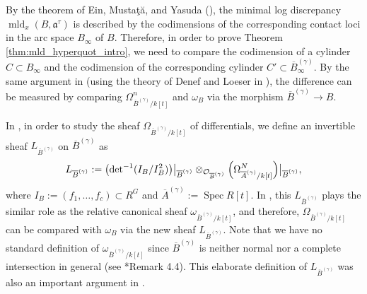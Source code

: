 \documentclass[a4paper,11pt]{amsart}
\theoremstyle{definition}
\theoremstyle{remark}
\begin{document}
By the theorem of Ein, Musta{\c{t}}{\u{a}}, and Yasuda (\cite{EMY03}), 
the minimal log discrepancy $\operatorname{mld}_x(B,\mathfrak{a}^{\tau})$ is described by the codimensions of the corresponding contact loci in the arc space $B_{\infty}$ of $B$. 
Therefore, in order to prove Theorem \ref{thm:mld_hyperquot_intro}, 
we need to compare the codimension of a cylinder $C \subset B_{\infty}$ and the codimension of 
the corresponding cylinder $C' \subset \overline{B}^{(\gamma)}_{\infty}$. 
By the same argument in \cite{NS22} (using the theory of Denef and Loeser in \cite{DL02}), the difference can be measured by comparing $\Omega _{\overline{B}^{(\gamma)} / k[t]} ^n$ and $\omega _{B}$ via the morphism $\overline{B}^{(\gamma)} \to B$. 

In \cite{NS22}, in order to study the sheaf $\Omega _{\overline{B}^{(\gamma)} / k[t]}$ of differentials, 
we define an invertible sheaf $L_{\overline{B}^{(\gamma)}}$ on $\overline{B}^{(\gamma)}$ as 
\[
L_{\overline{B}^{(\gamma)}} 
:= 
\bigl( \operatorname{det}^{-1} (I_B/I_B^2) \bigr) \big|_{\overline{B}^{(\gamma)}}
\otimes _{\mathcal{O}_{\overline{B}^{(\gamma)}}} 
\Bigl( \Omega _{\overline{A}^{(\gamma)} /k[t]} ^N \Bigr) \big|_{\overline{B}^{(\gamma)}}, 
\]
where $I_B := \left( f_1, \ldots , f_c \right) \subset R^G$ and 
$\overline{A}^{(\gamma)} := \operatorname{Spec} R[t]$. 
In \cite{NS22}, this $L_{\overline{B}^{(\gamma)}}$ plays the similar role as the relative canonical sheaf $\omega _{\overline{B}^{(\gamma)} / k[t]}$, and therefore, $\Omega _{\overline{B}^{(\gamma)} / k[t]}$ can be compared with $\omega _{B}$ via the new sheaf $L_{\overline{B}^{(\gamma)}}$. 
Note that we have no standard definition of $\omega _{\overline{B}^{(\gamma)} / k[t]}$ since $\overline{B}^{(\gamma)}$ is neither normal nor a complete intersection in general (see \cite{NS22}*{Remark 4.4}). 
This elaborate definition of $L_{\overline{B}^{(\gamma)}}$ was also an important argument in \cite{NS22}.
\end{document}
